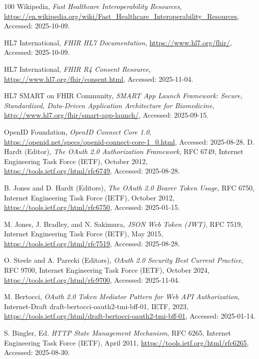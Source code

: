 \begin{thebibliography}{100}
  Wikipedia,
  \textit{Fast Healthcare Interoperability Resources},
  \url{https://en.wikipedia.org/wiki/Fast_Healthcare_Interoperability_Resources}, Accessed: 2025-10-09.

  HL7 International,
  \textit{FHIR HL7 Documentation},
  \url{https://www.hl7.org/fhir/}, Accessed: 2025-10-09.


  HL7 International,
  \textit{FHIR R4 Consent Resource},
  \url{https://www.hl7.org/fhir/consent.html}, Accessed: 2025-11-04.

  HL7 SMART on FHIR Community,
  \textit{SMART App Launch Framework: Secure, Standardized, Data-Driven Application Architecture for Biomedicine},
  \url{http://www.hl7.org/fhir/smart-app-launch/}, Accessed: 2025-09-15.

  OpenID Foundation,
  \textit{OpenID Connect Core 1.0},
  \url{https://openid.net/specs/openid-connect-core-1_0.html}, Accessed: 2025-08-28.
  D. Hardt (Editor),
  \textit{The OAuth 2.0 Authorization Framework},
  RFC 6749, Internet Engineering Task Force (IETF), October 2012,
  \url{https://tools.ietf.org/html/rfc6749}, Accessed: 2025-08-28.

  B. Jones and D. Hardt (Editors),
  \textit{The OAuth 2.0 Bearer Token Usage},
  RFC 6750, Internet Engineering Task Force (IETF), October 2012,
  \url{https://tools.ietf.org/html/rfc6750}, Accessed: 2025-01-15.

  M. Jones, J. Bradley, and N. Sakimura,
  \textit{JSON Web Token (JWT)},
  RFC 7519, Internet Engineering Task Force (IETF), May 2015,
  \url{https://tools.ietf.org/html/rfc7519}, Accessed: 2025-08-28.

  O. Steele and A. Parecki (Editors),
  \textit{OAuth 2.0 Security Best Current Practice},
  RFC 9700, Internet Engineering Task Force (IETF), October 2024,
  \url{https://tools.ietf.org/html/rfc9700}, Accessed: 2025-11-04.

  M. Bertocci,
  \textit{OAuth 2.0 Token Mediator Pattern for Web API Authorization},
  Internet-Draft draft-bertocci-oauth2-tmi-bff-01, IETF, 2023,
  \url{https://tools.ietf.org/html/draft-bertocci-oauth2-tmi-bff-01}, Accessed: 2025-01-14.

  S. Bingler, Ed.
  \textit{HTTP State Management Mechanism},
  RFC 6265, Internet Engineering Task Force (IETF), April 2011,
  \url{https://tools.ietf.org/html/rfc6265}, Accessed: 2025-08-30.


\end{thebibliography}
